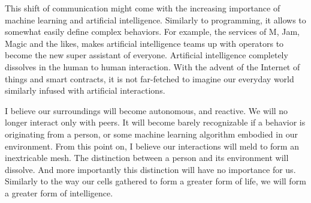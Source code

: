 This shift of communication might come with the increasing importance of machine learning and artificial intelligence.
Similarly to programming, it allows to somewhat easily define complex behaviors.
For example, the services of M, Jam, Magic and the likes, makes artificial intelligence teams up with operators to become the new super assistant of everyone.
Artificial intelligence completely dissolves in the human to human interaction.
With the advent of the Internet of things and smart contracts, it is not far-fetched to imagine our everyday world similarly infused with artificial interactions.

I believe our surroundings will become autonomous, and reactive.
We will no longer interact only with peers.
It will become barely recognizable if a behavior is originating from a person, or some machine learning algorithm embodied in our environment.
From this point on, I believe our interactions will meld to form an inextricable mesh.
The distinction between a person and its environment will dissolve.
And more importantly this distinction will have no importance for us.
Similarly to the way our cells gathered to form a greater form of life, we will form a greater form of intelligence.




